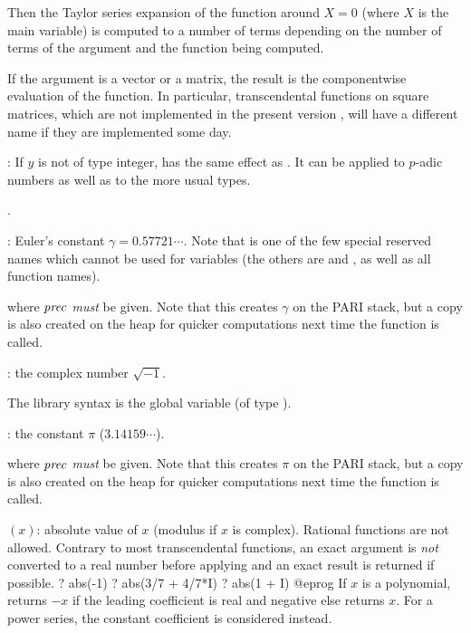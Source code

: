 Then the Taylor series expansion of the function around $X=0$ (where $X$ is
the main variable) is computed to a number of terms depending on the number
of terms of the argument and the function being computed.

\item If the argument is a vector or a matrix, the result is the
componentwise evaluation of the function. In particular, transcendental
functions on square matrices, which are not implemented in the present
version \vers, will have a different name if they are implemented some day.

\subseckbd{\pow}: If $y$ is not of type integer,  has the same
effect as . It can be applied to $p$-adic numbers as well
as to the more usual types.

.

: Euler's constant $\gamma=0.57721\cdots$. Note that
 is one of the few special reserved names which cannot be used for
variables (the others are  and , as well as all function
names). \label{se:euler}

 where $\hbox{\it prec\/}$ \emph{must} be given. Note that
this creates $\gamma$ on the PARI stack, but a copy is also created on the
heap for quicker computations next time the function is called.

: the complex number $\sqrt{-1}$.

The library syntax is the global variable  (of type ).

: the constant $\pi$ ($3.14159\cdots$).\label{se:pi}

 where $\hbox{\it prec\/}$ \emph{must} be given. Note that
this creates $\pi$ on the PARI stack, but a copy is also created on the heap
for quicker computations next time the function is called.

$(x)$: absolute value of $x$ (modulus if $x$ is complex).
Rational functions are not allowed. Contrary to most transcendental
functions, an exact argument is \emph{not} converted to a real number before
applying  and an exact result is returned if possible.
\bprog
? abs(-1)
? abs(3/7 + 4/7*I)
? abs(1 + I)
@eprog\noindent
If $x$ is a polynomial, returns $-x$ if the leading coefficient is
real and negative else returns $x$. For a power series, the constant
coefficient is considered instead.

